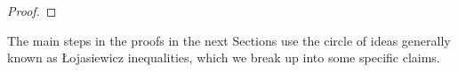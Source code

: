 \documentclass[12pt]{amsart}
\theoremstyle{definition}
\theoremstyle{remark}
\numberwithin{equation}{section}
\newcommand{\re}{\mathbb{R}}
\begin{document}
\begin{proof}
%
\end{proof}


The main steps in the proofs in the next Sections use the circle of ideas generally known as \L ojasiewicz inequalities, which we break up into some specific claims.
\end{document}
